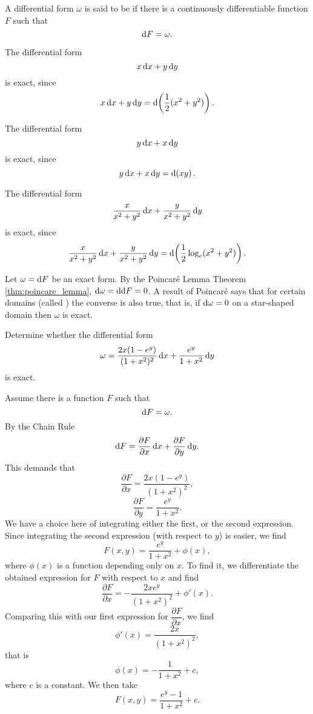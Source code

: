 \begin{df}
A differential form $\omega$ is said to be  if there is
a continuously differentiable function $F$ such that
$$\d F = \omega .$$
\end{df}

\begin{exa}
The differential form $$x\d{x}+ y\d{y} $$is exact, since
$$x\d{x}+ y\d{y} = \d \left(\dfrac{1}{2}(x^2 + y^2)\right) . $$
\end{exa}
\begin{exa}
The differential form $$y\d{x}+ x\d{y} $$is exact, since
$$y\d{x}+ x\d{y} = \d \left(xy\right) . $$
\end{exa}

\begin{exa}
The differential form $$\dfrac{x}{x^2 + y^2}\d{x}+ \dfrac{y}{x^2 +
y^2}\d{y}
$$is exact, since
$$\dfrac{x}{x^2 + y^2}\d{x}+ \dfrac{y}{x^2 + y^2}\d{y} = \d \left(\dfrac{1}{2}\log_e (x^2 + y^2)\right) . $$
\end{exa}
\begin{rem}
Let $\omega = \d{F}$ be an exact form. By the Poincar\'{e} Lemma
Theorem \ref{thm:poincare_lemma}, $\d{\omega} = \d{\d{F}} = 0$.  A
result of Poincar\'{e} says that for certain domains (called ) the converse is also true, that is, if
$\d{\omega} = 0$ on a star-shaped domain then $\omega$ is exact.
\end{rem}\begin{exa} Determine whether the differential form $$\omega =
\dfrac{2x(1 - e^y)}{(1 + x^2)^2}\d{x}+ \dfrac{e^y}{1 + x^2}\d{y}$$
is exact.
\end{exa}
\begin{solu} Assume there is a function $F$ such that
$$\d F = \omega .$$By the Chain Rule
$$\d F = \dfrac{\partial F}{\partial x}\d{x}+ \dfrac{\partial F}{\partial y}\d{y} .$$
This demands that
$$\dfrac{\partial F}{\partial x} = \dfrac{2x(1 -
e^y)}{(1 + x^2)^2},$$
$$\dfrac{\partial F}{\partial y} = \dfrac{e^y}{1 + x^2}.$$
We have a choice here of integrating either the first, or the
second expression. Since integrating the second expression (with
respect to $y$) is easier, we find
$$F(x, y) = \dfrac{e^y}{1 + x^2} + \phi (x),$$where $\phi (x)$ is a
function depending only on $x$. To find it, we differentiate the
obtained expression for $F$ with respect to $x$ and find
$$\dfrac{\partial F}{\partial x} = -\dfrac{2xe^y}{(1 + x^2)^2} + \phi '(x).$$Comparing this with our first
expression for $\dfrac{\partial F}{\partial x}$, we find
$$\phi '(x) = \dfrac{2x}{(1 + x^2)^2}, $$that is
$$\phi (x) = -\dfrac{1}{1 + x^2} + c,$$where $c$ is a constant.
We then take
$$F(x, y) =  \dfrac{e^y - 1}{1 + x^2} + c.$$
\end{solu}
